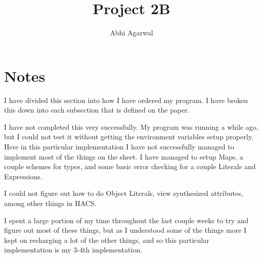 \documentclass[11pt, oneside]{article}
\title{Project 2B}
\author{Abhi Agarwal}
\date{}
\begin{document}
\maketitle
\section*{Notes}
\par I have divided this section into how I have ordered my program. I have broken this down into each subsection that is defined on the paper.
\par I have not completed this very successfully. My program was running a while ago, but I could not test it without getting the environment variables setup properly. Here in this particular implementation I have not successfully managed to implement most of the things on the sheet. I have managed to setup Maps, a couple schemes for types, and some basic error checking for a couple Literals and Expressions. 
\par I could not figure out how to do Object Literals, view synthesized attributes, among other things in HACS. 
\par I spent a large portion of my time throughout the last couple weeks to try and figure out most of these things, but as I understood some of the things more I kept on recharging a lot of the other things, and so this particular implementation is my 3-4th implementation. 
\end{document}
